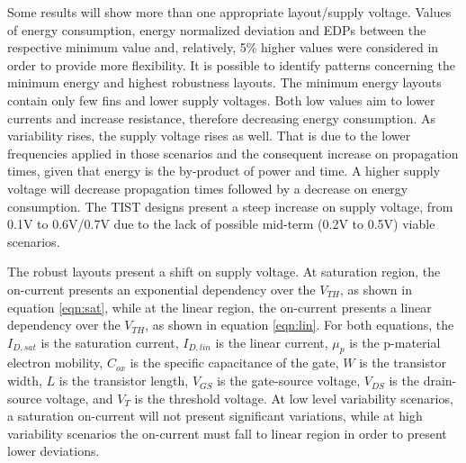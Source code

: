 \documentclass[pgmicro,mestrado,english]{iiufrgs}
\begin{document}
    Some results will show more than one appropriate layout/supply voltage. Values of energy consumption, energy normalized deviation and EDPs between the respective minimum value and, relatively, 5\% higher values were considered in order to provide more flexibility. It is possible to identify patterns concerning the minimum energy and highest robustness layouts. The minimum energy layouts contain only few fins and lower supply voltages. Both low values aim to lower currents and increase resistance, therefore decreasing energy consumption. As variability rises, the supply voltage rises as well. That is due to the lower frequencies applied in those scenarios and the consequent increase on propagation times, given that energy is the by-product of power and time. A higher supply voltage will decrease propagation times followed by a decrease on energy consumption. The TIST designs present a steep increase on supply voltage, from 0.1V to 0.6V/0.7V due to the lack of possible mid-term (0.2V to 0.5V) viable scenarios. 
    
    The robust layouts present a shift on supply voltage. At saturation region, the on-current presents an exponential dependency over the $V_{TH}$, as shown in equation \ref{eqn:sat}, while at the linear region, the on-current presents a linear dependency over the $V_{TH}$, as shown in equation \ref{eqn:lin}. For both equations, the $I_{D,sat}$ is the saturation current, $I_{D,lin}$ is the linear current, $\mu_p$ is the p-material electron mobility, $C_{ox}$ is the specific capacitance of the gate, $W$ is the transistor width, $L$ is the transistor length, $V_{GS}$ is the gate-source voltage, $V_{DS}$ is the drain-source voltage, and $V_T$ is the threshold voltage. At low level variability scenarios, a saturation on-current will not present significant variations, while at high variability scenarios the on-current must fall to linear region in order to present lower deviations.
    
\end{document}
